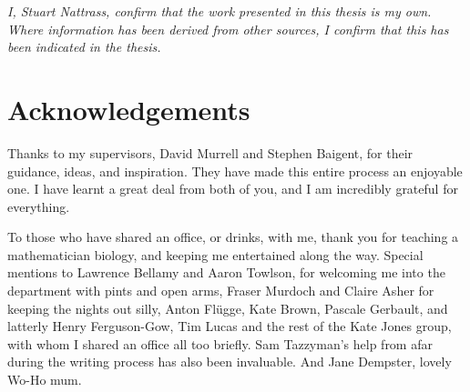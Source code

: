 \documentclass[a4paper]{report}
\begin{document}
\pagestyle{fancy}
\renewcommand{\chaptermark}[1]{%
\markboth{\MakeUppercase{%
\chaptername\ \thechapter.%
\ #1}}{}}
\fancyhead{}
\fancyhead[R]{\leftmark}




\newpage

\vspace*{\fill}

\begin{centering}

\textit{I, Stuart Nattrass, confirm that the work presented in this thesis is my own. Where information has been derived from other sources, I confirm that this has been indicated in the thesis.}

\end{centering}

\vspace*{\fill}


\newpage






\newpage


\doublespacing

\chapter*{Acknowledgements}

Thanks to my supervisors, David Murrell and Stephen Baigent, for their guidance, ideas, and inspiration. They have made this entire process an enjoyable one. I have learnt a great deal from both of you, and I am incredibly grateful for everything.

To those who have shared an office, or drinks, with me, thank you for teaching a mathematician biology, and keeping me entertained along the way. Special mentions to Lawrence Bellamy and Aaron Towlson, for welcoming me into the department with pints and open arms, Fraser Murdoch and Claire Asher for keeping the nights out silly, Anton Fl\"{u}gge, Kate Brown, Pascale Gerbault, and latterly Henry Ferguson-Gow, Tim Lucas and the rest of the Kate Jones group, with whom I shared an office all too briefly. Sam Tazzyman's help from afar during the writing process has also been invaluable. And Jane Dempster, lovely Wo-Ho mum.
\end{document}
